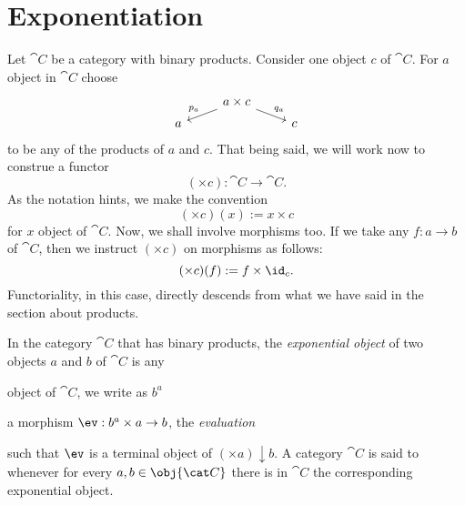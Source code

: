 
\section{Exponentiation}

Let \(\cat C\) be a category with binary products. Consider one object
\(c\) of \(\cat C\). For \(a\) object in \(\cat C\) choose
\[\begin{tikzcd}[row sep=tiny]
    & a \times c \ar["{p_a}", dl, swap] \ar["{q_a}", dr] & \\
    a & & c
  \end{tikzcd}\] to be any of the products of \(a\) and \(c\). That
being said, we will work now to construe a functor
\[(\times c) : \cat C \to \cat C .\] As the notation hints, we make the
convention
\[(\times c) (x) := x \times c\] for \(x\) object of \(\cat C\). 
Now, we shall involve morphisms too.  If
we take any \(f : a \to b\) of \(\cat C\), then we instruct
\((\times c)\) on morphisms as follows:
\[(\times c) (f) := f \times \id_c .\]  Functoriality,
in this case, directly descends from what we have said in the section
about products. 

\begin{definition}
  In the category \(\cat C\) that has binary products, the {\em
    exponential object} of two objects \(a\) and \(b\) of \(\cat C\)
  is any
  \begin{tcbitem}
  \item object of \(\cat C\), we write as \(b^a\)
  \item a morphism \(\ev : b^a \times a \to b\), the {\em evaluation}
  \end{tcbitem}
  such that \(\ev\) is a terminal object of
  \((\times a) \downarrow b\). A category \(\cat C\) is said to  whenever for every \(a, b \in \obj{\cat C}\) there is
  in \(\cat C\) the corresponding exponential object.
\end{definition}

